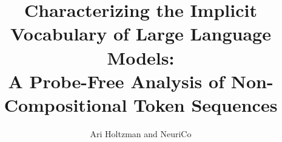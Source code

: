 \documentclass{article}
\title{Characterizing the Implicit Vocabulary of Large Language Models:\\ A Probe-Free Analysis of Non-Compositional Token Sequences}
\author{Ari Holtzman and NeuriCo}
\begin{document}
\maketitle

\begin{abstract}

\end{abstract}










\end{document}
